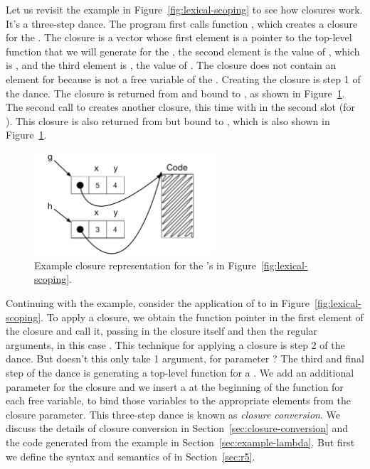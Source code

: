 \documentclass[11pt]{book}
\begin{document}
Let us revisit the example in Figure~\ref{fig:lexical-scoping} to see
how closures work. It's a three-step dance. The program first calls
function , which creates a closure for the . The
closure is a vector whose first element is a pointer to the top-level
function that we will generate for the , the second
element is the value of , which is , and the third
element is , the value of . The closure does not
contain an element for  because  is not a free
variable of the . Creating the closure is step 1 of the
dance. The closure is returned from  and bound to , as
shown in Figure~\ref{fig:closures}.
%
The second call to  creates another closure, this time with
 in the second slot (for ). This closure is also
returned from  but bound to , which is also shown in
Figure~\ref{fig:closures}.

\begin{figure}[tbp]
\centering \includegraphics[width=0.6\textwidth]{figs/closures}
\caption{Example closure representation for the 's
  in Figure~\ref{fig:lexical-scoping}.}
\label{fig:closures}
\end{figure}

Continuing with the example, consider the application of  to
 in Figure~\ref{fig:lexical-scoping}.  To apply a closure, we
obtain the function pointer in the first element of the closure and
call it, passing in the closure itself and then the regular arguments,
in this case . This technique for applying a closure is step
2 of the dance.
%
But doesn't this  only take 1 argument, for parameter
? The third and final step of the dance is generating a
top-level function for a .  We add an additional
parameter for the closure and we insert a  at the beginning
of the function for each free variable, to bind those variables to the
appropriate elements from the closure parameter.
%
This three-step dance is known as \emph{closure conversion}.  We
discuss the details of closure conversion in
Section~\ref{sec:closure-conversion} and the code generated from the
example in Section~\ref{sec:example-lambda}. But first we define the
syntax and semantics of \LangLam{} in Section~\ref{sec:r5}.
\end{document}
